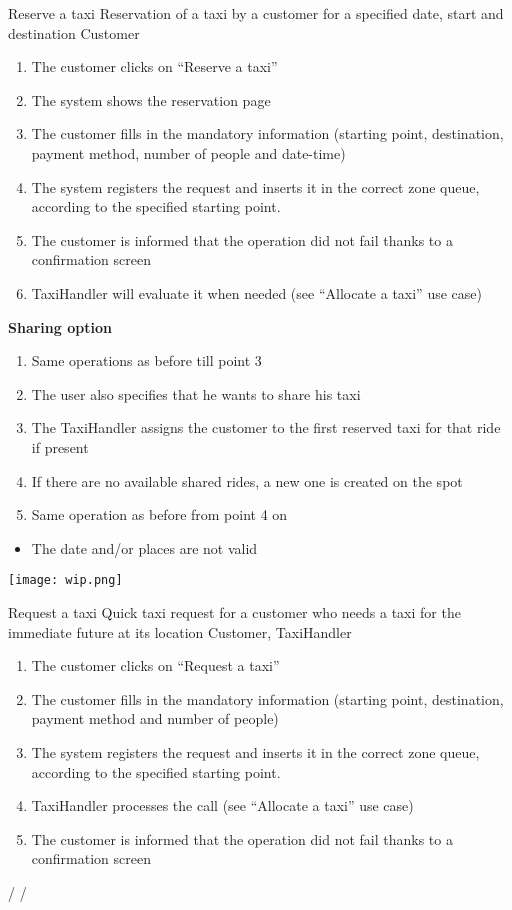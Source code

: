 \usecase
{Reserve a taxi}
{Reservation of a taxi by a customer for a specified date, start and destination}
{Customer}
{
\begin{enumerate}
	\item The customer clicks on ``Reserve a taxi''
	\item The system shows the reservation page
	\item The customer fills in the mandatory information (starting point, destination, payment method, number of people and date-time)
	\item The system registers the request and inserts it in the correct zone queue, according to the specified starting point.
	\item The customer is informed that the operation did not fail thanks to a confirmation screen
    \item TaxiHandler will evaluate it when needed (see ``Allocate a taxi'' use case)
\end{enumerate}
}
{
\textbf{Sharing option}
\begin{enumerate}
	\item Same operations as before till point 3
	\item The user also specifies that he wants to share his taxi
	\item The TaxiHandler assigns the customer to the first reserved taxi for that ride if present
	\item If there are no available shared rides, a new one is created on the spot
	\item Same operation as before from point 4 on
\end{enumerate}
}
{ 
\begin{itemize}
\item The date and/or places are not valid
\end{itemize}
}

\pagebreak
\texttt{[image: wip.png]}

\usecase
{Request a taxi}
{Quick taxi request for a customer who needs a taxi for the immediate future at its location}
{Customer, TaxiHandler}
{
\begin{enumerate}
	\item The customer clicks on ``Request a taxi''
	\item The customer fills in the mandatory information (starting point, destination, payment method and number of people)
	\item The system registers the request and inserts it in the correct zone queue, according to the specified starting point.
	\item TaxiHandler processes the call (see ``Allocate a taxi'' use case)
	\item The customer is informed that the operation did not fail thanks to a confirmation screen
\end{enumerate}
}
{
/
}
{ 
/
}

